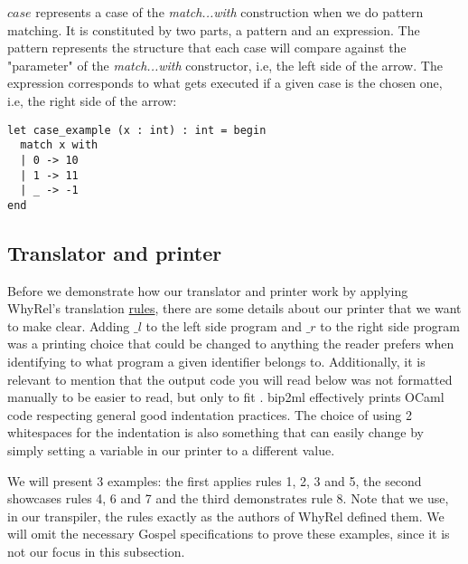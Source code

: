 $case$ represents a case of the \emph{match...with} construction when we do pattern matching.
It is constituted by two parts, a pattern and an expression.
The pattern represents the structure that each case will compare against the "parameter" of the \emph{match...with} constructor, i.e, the left side of the arrow.
The expression corresponds to what gets executed if a given case is the chosen one, i.e, the right side of the arrow:

\begin{lstlisting}[mathescape, basicstyle=\ttfamily, columns=flexible,
                    emph={type, and, let, rec, if, then, else, mod, in, for, while, do, done, to, begin, end, assert, match, with, of, open, include,ref},
                    emphstyle=\ttfamily\bfseries\color{myorange}]
let case_example (x : int) : int = begin
  match x with
  | 0 -> 10
  | 1 -> 11
  | _ -> -1 
end
\end{lstlisting}


\FloatBarrier
\subsection{Translator and printer}
\label{subsec:translator_printer}

Before we demonstrate how our translator and printer work by applying WhyRel's translation \hyperref[fig:translation-biprograms-rules]{rules}, there are some details about our printer that we want to make clear.
Adding $\_l$ to the left side program and $\_r$ to the right side program was a printing choice that could be changed to anything the reader prefers when identifying to what program a given identifier belongs to.
Additionally, it is relevant to mention that the output code you will read below was not formatted manually to be easier to read, but only to fit .
bip2ml effectively prints OCaml code respecting general good indentation practices.
The choice of using 2 whitespaces for the indentation is also something that can easily change by simply setting a variable in our printer to a different value.

We will present 3 examples: the first applies rules 1, 2, 3 and 5, the second showcases rules 4, 6 and 7 and the third demonstrates rule 8.
Note that we use, in our transpiler, the rules exactly as the authors of WhyRel defined them. 
We will omit the necessary Gospel specifications to prove these examples, since it is not our focus in this subsection.

